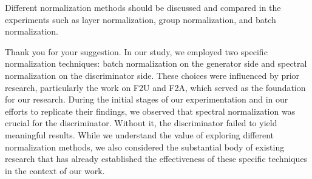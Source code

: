 \documentclass{article}
\begin{document}

\RC Different normalization methods should be discussed and compared in the experiments such as layer normalization, group normalization, and batch normalization.

\AR  Thank you for your suggestion. In our study, we employed two specific normalization techniques: batch normalization on the generator side and spectral normalization on the discriminator side. These choices were influenced by prior research, particularly the work on F2U and F2A, which served as the foundation for our research. During the initial stages of our experimentation and in our efforts to replicate their findings, we observed that spectral normalization was crucial for the discriminator. Without it, the discriminator failed to yield meaningful results. While we understand the value of exploring different normalization methods, we also considered the substantial body of existing research that has already established the effectiveness of these specific techniques in the context of our work. 




\end{document}
